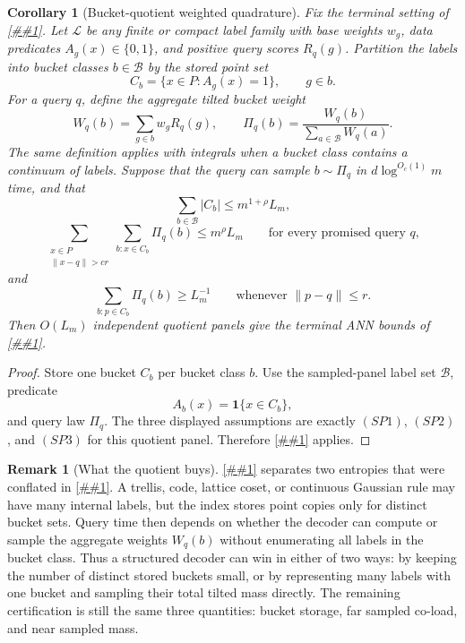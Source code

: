 \documentclass[10pt]{article}
\newcommand{\cref}[1]{\ref{##1}}
\newcommand{\Cref}[1]{\ref{##1}}
\newtheorem{corollary}[theorem]{Corollary}
\theoremstyle{definition}
\newtheorem{remark}[theorem]{Remark}
\begin{document}
\begin{corollary}[Bucket-quotient weighted quadrature]
   \label{cor:bucket-quotient-quadrature}
   Fix the terminal setting of \cref{prop:sampled-structured-panel}.  Let
   \(\mathcal L\) be any finite or compact label family with base weights
   \(w_g\), data predicates \(A_g(x)\in\{0,1\}\), and positive query scores
   \(R_q(g)\).  Partition the labels into bucket classes \(b\in\mathcal B\) by
   the stored point set
   \[
      C_b=\{x\in P:A_g(x)=1\},
      \qquad g\in b.
   \]
   For a query \(q\), define the aggregate tilted bucket weight
   \[
      W_q(b)=\sum_{g\in b}w_gR_q(g),
      \qquad
      \Pi_q(b)=\frac{W_q(b)}{\sum_{a\in\mathcal B}W_q(a)} .
   \]
   The same definition applies with integrals when a bucket class contains a
   continuum of labels.  Suppose that the query can sample \(b\sim\Pi_q\) in
   \(d\log^{O_c(1)}m\) time, and that
   \[
      \sum_{b\in\mathcal B}|C_b|\le m^{1+\rho}L_m,
      \tag{BQ1}
   \]
   \[
      \sum_{\substack{x\in P\\\|x-q\|>cr}}
      \sum_{b:x\in C_b}\Pi_q(b)
      \le m^\rho L_m
      \qquad\text{for every promised query }q,
      \tag{BQ2}
   \]
   and
   \[
      \sum_{b:p\in C_b}\Pi_q(b)
      \ge L_m^{-1}
      \qquad\text{whenever }\|p-q\|\le r.
      \tag{BQ3}
   \]
   Then \(O(L_m)\) independent quotient panels give the terminal ANN bounds of
   \cref{prop:sampled-structured-panel}.
\end{corollary}

\begin{proof}
   Store one bucket \(C_b\) per bucket class \(b\).  Use the sampled-panel label
   set \(\mathcal B\), predicate
   \[
      A_b(x)=\mathbf 1\{x\in C_b\},
   \]
   and query law \(\Pi_q\).  The three displayed assumptions are exactly
   \((SP1)\), \((SP2)\), and \((SP3)\) for this quotient panel.  Therefore
   \cref{prop:sampled-structured-panel} applies.
\end{proof}

\begin{remark}[What the quotient buys]
   \label{rem:bucket-quotient}
   \Cref{cor:bucket-quotient-quadrature} separates two entropies that were
   conflated in \cref{cor:weighted-gaussian-quadrature-panel}.  A trellis,
   code, lattice coset, or continuous Gaussian rule may have many internal
   labels, but the index stores point copies only for distinct bucket sets.
   Query time then depends on whether the decoder can compute or sample the
   aggregate weights \(W_q(b)\) without enumerating all labels in the bucket
   class.  Thus a structured decoder can win in either of two ways: by keeping
   the number of distinct stored buckets small, or by representing many labels
   with one bucket and sampling their total tilted mass directly.  The
   remaining certification is still the same three quantities: bucket storage,
   far sampled co-load, and near sampled mass.
\end{remark}
\end{document}
